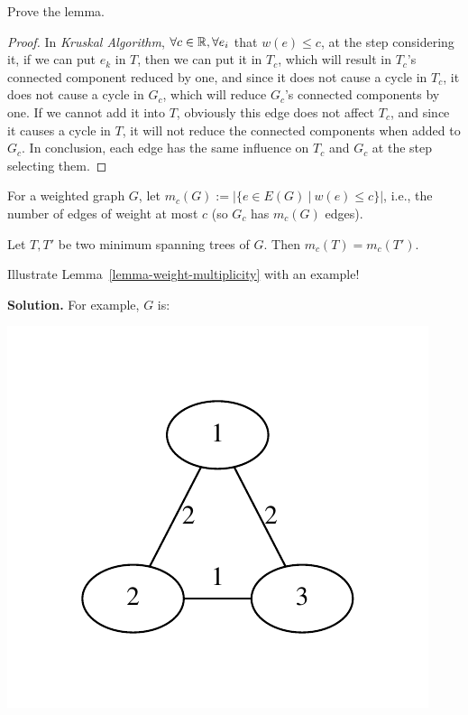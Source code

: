 \begin{exercise}
     Prove the lemma.
\end{exercise}

\begin{proof}

    In \emph{Kruskal Algorithm}, $\forall c \in \mathbb{R}, \forall e_i$ that $w(e)\leq c$, at the step considering it, if we can put $e_k$ in $T$, then we can put it in $T_c$, which will result in $T_c$'s connected component reduced by one, and since it does not cause a cycle in $T_c$, it does not cause a cycle in $G_c$, which will reduce $G_c$'s connected components by one. If we cannot add it into $T$, obviously this edge does not affect $T_c$, and since it causes a cycle in $T$, it will not reduce the connected components when added to $G_c$. In conclusion, each edge has the same influence on $T_c$ and $G_c$ at the step selecting them.

\end{proof}

\begin{definition}
  For a weighted graph $G$, let $m_c(G) := | \{ e \in E(G) \ | \ w(e) \leq c\}|$, i.e.,
  the number of edges of weight at most $c$ (so $G_c$ has $m_c(G)$ edges).
\end{definition}

\begin{lemma}
  Let $T, T'$ be two minimum spanning trees of $G$. Then
  $m_c(T) = m_c(T')$.
  \label{lemma-weight-multiplicity}
\end{lemma}

\begin{exercise}
Illustrate Lemma~\ref{lemma-weight-multiplicity} with an example!
\end{exercise}

\textbf{Solution.}
For example, $G$ is:

\includegraphics[width= .4\textwidth]{8-8-1.pdf}

